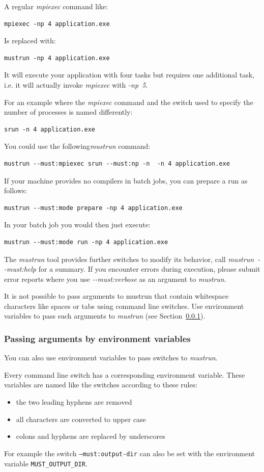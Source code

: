 \documentclass[english]{scrartcl}
\begin{document}
A regular \emph{mpiexec} command like:
\begin{verbatim}
mpiexec -np 4 application.exe
\end{verbatim}
Is replaced with:
\begin{verbatim}
mustrun -np 4 application.exe
\end{verbatim}
It will execute your application with four tasks but requires one additional task,
i.e. it will actually invoke \emph{mpiexec} with \emph{\mbox{-np 5}}.

For an example where the \emph{mpiexec} command and the switch used to
specify the number of processes is named differently:
\begin{verbatim}
srun -n 4 application.exe
\end{verbatim}
You could use the following\emph{mustrun} command:
\begin{verbatim}
mustrun --must:mpiexec srun --must:np -n  -n 4 application.exe
\end{verbatim}

\noindent{}If your machine provides no compilers in batch jobs, you can prepare
a run as follows:
\begin{verbatim}
mustrun --must:mode prepare -np 4 application.exe
\end{verbatim}
In your batch job you would then just execute:
\begin{verbatim}
mustrun --must:mode run -np 4 application.exe
\end{verbatim}

\noindent{}The \emph{mustrun} tool provides further switches to modify its
behavior, call \mbox{\emph{mustrun \mbox{-{}-must:help}}} for a summary.  
If you
encounter errors during execution, please submit error reports where you use \emph{\mbox{-{}-must:verbose}} as
an argument to \emph{mustrun}.

It is not possible to pass arguments to mustrun that contain whitespace characters like spaces or tabs using command line switches.
Use environment variables to pass such arguments to \emph{mustrun} (see Section~\ref{section:envvar_args}).


\subsubsection{Passing arguments by environment variables}
\label{section:envvar_args}
You can also use environment variables to pass switches to \emph{mustrun}.

Every command line switch has a corresponding environment variable.
These variables are named like the switches according to these rules:
\begin{itemize}
	\item the two leading hyphens are removed
	\item all characters are converted to upper case
	\item colons and hyphens are replaced by underscores
\end{itemize}
For example the switch \texttt{--must:output-dir} can also be set with the environment variable \texttt{MUST\_OUTPUT\_DIR}.
\end{document}
